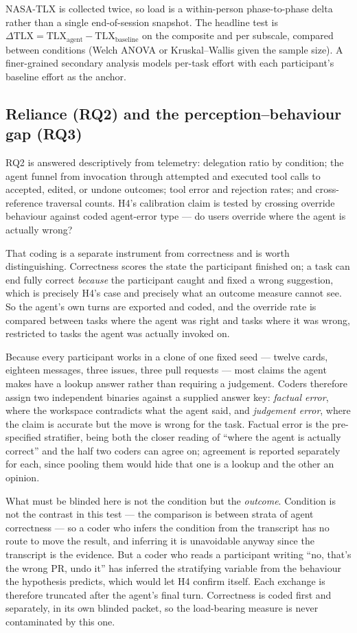 \documentclass[acmsmall,review,screen]{acmart}
\begin{document}
NASA-TLX is collected twice, so load is a within-person phase-to-phase delta
rather than a single end-of-session snapshot. The headline test is
$\Delta\mathrm{TLX} = \mathrm{TLX}_{\text{agent}} - \mathrm{TLX}_{\text{baseline}}$
on the composite and per subscale, compared between conditions (Welch ANOVA or
Kruskal--Wallis given the sample size). A finer-grained secondary analysis models
per-task effort with each participant's baseline effort as the anchor.

\subsection{Reliance (RQ2) and the perception--behaviour gap (RQ3)}

RQ2 is answered descriptively from telemetry: delegation ratio by condition; the
agent funnel from invocation through attempted and executed tool calls to
accepted, edited, or undone outcomes; tool error and rejection rates; and
cross-reference traversal counts. H4's calibration claim is tested by crossing
override behaviour against coded agent-error type --- do users override where the
agent is actually wrong?

That coding is a separate instrument from correctness and is worth
distinguishing. Correctness scores the state the participant finished on; a task
can end fully correct \emph{because} the participant caught and fixed a wrong
suggestion, which is precisely H4's case and precisely what an outcome measure
cannot see. So the agent's own turns are exported and coded, and the override
rate is compared between tasks where the agent was right and tasks where it was
wrong, restricted to tasks the agent was actually invoked on.

Because every participant works in a clone of one fixed seed --- twelve cards,
eighteen messages, three issues, three pull requests --- most claims the agent
makes have a lookup answer rather than requiring a judgement. Coders therefore
assign two independent binaries against a supplied answer key: \emph{factual
error}, where the workspace contradicts what the agent said, and \emph{judgement
error}, where the claim is accurate but the move is wrong for the task. Factual
error is the pre-specified stratifier, being both the closer reading of ``where
the agent is actually correct'' and the half two coders can agree on;
agreement is reported separately for each, since pooling them would hide that one
is a lookup and the other an opinion.

What must be blinded here is not the condition but the \emph{outcome}. Condition
is not the contrast in this test --- the comparison is between strata of agent
correctness --- so a coder who infers the condition from the transcript has no
route to move the result, and inferring it is unavoidable anyway since the
transcript is the evidence. But a coder who reads a participant writing ``no,
that's the wrong PR, undo it'' has inferred the stratifying variable from the
behaviour the hypothesis predicts, which would let H4 confirm itself. Each
exchange is therefore truncated after the agent's final turn. Correctness is
coded first and separately, in its own blinded packet, so the load-bearing
measure is never contaminated by this one.
\end{document}
